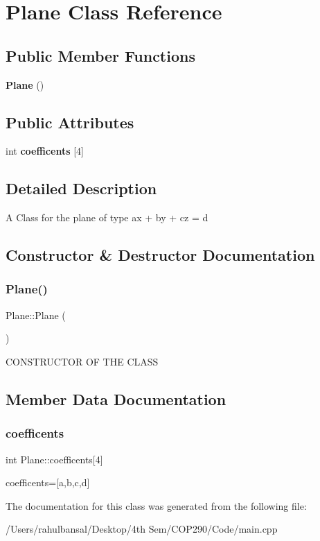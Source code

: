 \section{Plane Class Reference}
\label{class_plane}
\subsection*{Public Member Functions}
\begin{DoxyCompactItemize}
\item 
\textbf{ Plane} ()
\end{DoxyCompactItemize}
\subsection*{Public Attributes}
\begin{DoxyCompactItemize}
\item 
int \textbf{ coefficents} [4]
\end{DoxyCompactItemize}


\subsection{Detailed Description}
A Class for the plane of type ax + by + cz = d 

\subsection{Constructor \& Destructor Documentation}
\mbox{\label{class_plane_acac0d9c003e0ab10d07b146c3566a0c7}} 
\subsubsection{Plane()}
{\footnotesize\ttfamily Plane\+::\+Plane (\begin{DoxyParamCaption}{ }\end{DoxyParamCaption})}

C\+O\+N\+S\+T\+R\+U\+C\+T\+OR OF T\+HE C\+L\+A\+SS 

\subsection{Member Data Documentation}
\mbox{\label{class_plane_a4297b428805295e806cad952c3eed992}} 
\subsubsection{coefficents}
{\footnotesize\ttfamily int Plane\+::coefficents[4]}

coefficents=[a,b,c,d] 

The documentation for this class was generated from the following file\+:\begin{DoxyCompactItemize}
\item 
/\+Users/rahulbansal/\+Desktop/4th Sem/\+C\+O\+P290/\+Code/main.\+cpp\end{DoxyCompactItemize}
